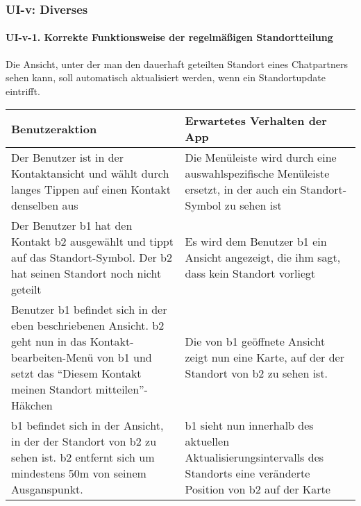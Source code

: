 \clearpage
\subsubsection{UI-v: Diverses}\label{v-diverses}

\paragraph{UI-v-1. Korrekte Funktionsweise der regelmäßigen
Standortteilung}\label{korrekte-funktionsweise-der-regelmuxe4uxdfigen-standortteilung}

Die Ansicht, unter der man den dauerhaft geteilten Standort eines
Chatpartners sehen kann, soll automatisch aktualisiert werden, wenn ein
Standortupdate eintrifft.

\begin{longtable}{|p{8cm}|p{8.5cm}|}
\hline
Benutzeraktion & Erwartetes Verhalten der App\tabularnewline
\hline

Der Benutzer ist in der Kontaktansicht und wählt durch langes Tippen auf
einen Kontakt denselben aus & Die Menüleiste wird durch eine
auswahlspezifische Menüleiste ersetzt, in der auch ein Standort-Symbol
zu sehen ist\tabularnewline
Der Benutzer b1 hat den Kontakt b2 ausgewählt und tippt auf das
Standort-Symbol. Der b2 hat seinen Standort noch nicht geteilt & Es wird
dem Benutzer b1 ein Ansicht angezeigt, die ihm sagt, dass kein Standort
vorliegt\tabularnewline
Benutzer b1 befindet sich in der eben beschriebenen Ansicht. b2 geht nun
in das Kontakt-bearbeiten-Menü von b1 und setzt das ``Diesem Kontakt
meinen Standort mitteilen''-Häkchen & Die von b1 geöffnete Ansicht zeigt
nun eine Karte, auf der der Standort von b2 zu sehen ist.\tabularnewline
b1 befindet sich in der Ansicht, in der der Standort von b2 zu sehen
ist. b2 entfernt sich um mindestens 50m von seinem Ausganspunkt. & b1
sieht nun innerhalb des aktuellen Aktualisierungsintervalls des
Standorts eine veränderte Position von b2 auf der Karte\tabularnewline
\hline
\end{longtable}
